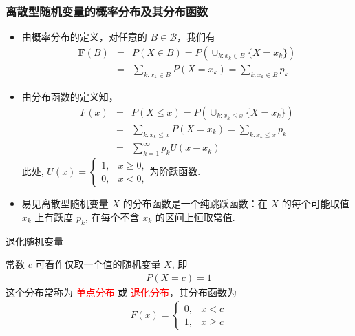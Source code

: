 \begin{frame}
	\frametitle{离散型随机变量的概率分布及其分布函数}
	\begin{itemize}[<+-|alert@+>]
		\item 由概率分布的定义，对任意的 $B\in \mathcal{B}$，我们有
		    {\small \begin{eqnarray*}
			      \mathbf{F}(B)&=&P(X\in B)=P(\cup_{k:x_k\in B}\{X=x_k\})\\
			      &=&\sum_{k:x_k\in B}P(X=x_k)=\sum_{k:x_k\in B}p_k
		      \end{eqnarray*}}
		\item 由分布函数的定义知，
		      {\small \begin{eqnarray*}
			      F(x)&=&P(X\le x)=P(\cup_{k:x_k\le x}\{X=x_k\})\\
			      &=&\sum_{k:x_k\le x}P(X=x_k)=\sum_{k:x_k\le x}p_k\\
				  &=&\sum_{k=1}^\infty p_kU(x-x_k)
		      \end{eqnarray*}}
			  此处, $U(x)=\left\{\begin{array}{ll}
				1, & x\geq 0,\\
				0, & x<0,
				\end{array}\right.
			  $为阶跃函数.
		\item 易见离散型随机变量 $X$ 的分布函数是一个纯跳跃函数：在 $X$ 的每个可能取值 $x_k$ 上有跃度 $p_k$, 在每个不含 $x_k$ 的区间上恒取常值.
	\end{itemize}

\end{frame}
\begin{frame}{退化随机变量}
	\begin{exam}
		常数 $c$ 可看作仅取一个值的随机变量 $X$, 即
		\begin{eqnarray*}
			P(X=c)=1
		\end{eqnarray*}
		这个分布常称为 \textcolor{red}{单点分布} 或 \textcolor{red}{退化分布}，其分布函数为
		\pause \begin{eqnarray*}
			F(x)=\left\{
			\begin{array}{ll}
				0, & x<c     \\
				1, & x\ge c
			\end{array}
			\right.
		\end{eqnarray*}
	\end{exam}

\end{frame}





